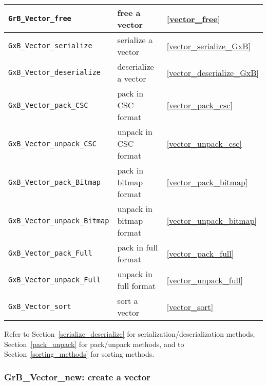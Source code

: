 \documentclass[12pt]{article}
\begin{document}
{\begin{tabular}{lll}
\verb'GrB_Vector_free'           & free a vector                    & \ref{vector_free} \\
\hline
\hline
\verb'GxB_Vector_serialize'      & serialize a vector               & \ref{vector_serialize_GxB} \\
\verb'GxB_Vector_deserialize'    & deserialize a vector             & \ref{vector_deserialize_GxB} \\
\hline
\hline
\verb'GxB_Vector_pack_CSC'         & pack in CSC format      & \ref{vector_pack_csc} \\
\verb'GxB_Vector_unpack_CSC'       & unpack in CSC format    & \ref{vector_unpack_csc} \\
\hline
\verb'GxB_Vector_pack_Bitmap'      & pack in bitmap format   & \ref{vector_pack_bitmap} \\
\verb'GxB_Vector_unpack_Bitmap'    & unpack in bitmap format & \ref{vector_unpack_bitmap} \\
\hline
\verb'GxB_Vector_pack_Full'        & pack in full format     & \ref{vector_pack_full} \\
\verb'GxB_Vector_unpack_Full'      & unpack in full format   & \ref{vector_unpack_full} \\
\hline
\hline
\verb'GxB_Vector_sort'          & sort a vector & \ref{vector_sort} \\
\end{tabular}
}

\vspace{0.2in}
Refer to
Section~\ref{serialize_deserialize} for serialization/deserialization methods,
Section~\ref{pack_unpack} for pack/unpack methods,
and to
Section~\ref{sorting_methods} for sorting methods.

\newpage
\subsubsection{{\sf GrB\_Vector\_new:}           create a vector}
\label{vector_new}
\end{document}
